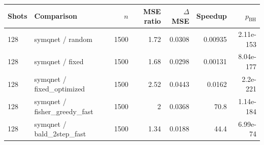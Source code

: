 \begin{tabular}{llrrrrr}
\toprule
Shots & Comparison & $n$ & MSE ratio & $\Delta$MSE & Speedup & $p_{\mathrm{BH}}$ \\
\midrule
128 & symqnet / random & 1500 & 1.72 & 0.0308 & 0.00935 & 2.11e-153 \\
128 & symqnet / fixed & 1500 & 1.68 & 0.0298 & 0.00131 & 8.04e-177 \\
128 & symqnet / fixed\_optimized & 1500 & 2.52 & 0.0443 & 0.0162 & 2.2e-221 \\
128 & symqnet / fisher\_greedy\_fast & 1500 & 2 & 0.0368 & 70.8 & 1.14e-184 \\
128 & symqnet / bald\_2step\_fast & 1500 & 1.34 & 0.0188 & 44.4 & 6.99e-74 \\
\bottomrule
\end{tabular}
